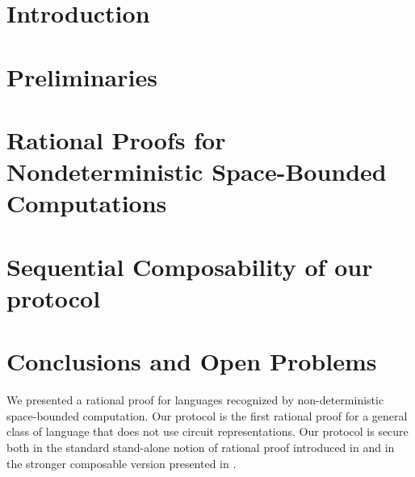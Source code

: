 \documentclass{llncs}
\begin{document}
\section{Introduction}


\section{Preliminaries}


%


\section{Rational Proofs for Nondeterministic Space-Bounded Computations }


\section{Sequential Composability of our protocol}


\section{Conclusions and Open Problems}
We presented a rational proof for languages recognized by non-deterministic space-bounded computation. Our protocol is the first rational proof for a general class of language that does not use circuit representations. Our protocol is secure both in the standard stand-alone notion of rational proof introduced in 
\cite{am} and in the stronger composable version presented in \cite{cg15}. 
\end{document}
